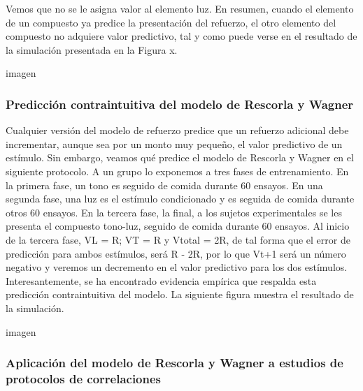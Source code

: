\documentclass[
  letterpaper,
]{book}
\begin{document}
Vemos que no se le asigna valor al elemento luz. En resumen, cuando el
elemento de un compuesto ya predice la presentación del refuerzo, el
otro elemento del compuesto no adquiere valor predictivo, tal y como
puede verse en el resultado de la simulación presentada en la Figura x.

imagen

\subsubsection{Predicción contraintuitiva del modelo de Rescorla y
Wagner}\label{predicciuxf3n-contraintuitiva-del-modelo-de-rescorla-y-wagner}

Cualquier versión del modelo de refuerzo predice que un refuerzo
adicional debe incrementar, aunque sea por un monto muy pequeño, el
valor predictivo de un estímulo. Sin embargo, veamos qué predice el
modelo de Rescorla y Wagner en el siguiente protocolo. A un grupo lo
exponemos a tres fases de entrenamiento. En la primera fase, un tono es
seguido de comida durante 60 ensayos. En una segunda fase, una luz es el
estímulo condicionado y es seguida de comida durante otros 60 ensayos.
En la tercera fase, la final, a los sujetos experimentales se les
presenta el compuesto tono-luz, seguido de comida durante 60 ensayos. Al
inicio de la tercera fase, VL = R; VT = R y Vtotal = 2R, de tal forma
que el error de predicción para ambos estímulos, será R - 2R, por lo que
Vt+1 será un número negativo y veremos un decremento en el valor
predictivo para los dos estímulos. Interesantemente, se ha encontrado
evidencia empírica que respalda esta predicción contraintuitiva del
modelo. La siguiente figura muestra el resultado de la simulación.

imagen

\subsubsection{Aplicación del modelo de Rescorla y Wagner a estudios de
protocolos de
correlaciones}\label{aplicaciuxf3n-del-modelo-de-rescorla-y-wagner-a-estudios-de-protocolos-de-correlaciones}
\end{document}
